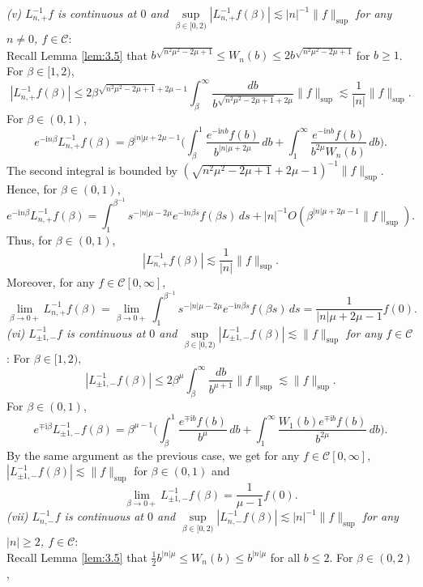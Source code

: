 \documentclass[11pt]{article}
\makeatletter
\renewenvironment{proof}[1][\proofname]{\par
  \vspace{-.7\topsep}%
  \pushQED{\qed}%
  \normalfont
  \topsep0pt \partopsep0pt %
  \trivlist
  \item[\hskip\labelsep
        \itshape
    #1\@addpunct{.}]\ignorespaces
}{%
  \popQED\endtrivlist\@endpefalse
  \addvspace{6pt plus 6pt} %
}
\theoremstyle{definition}
\theoremstyle{remark}
\numberwithin{equation}{section}
\newcommand{\mcal}{\mathcal}
\newcommand{\norm}[1]{\lVert #1 \rVert}
\makeatother
\begin{document}
\begin{proof}
\textit{(v) $L_{n,+}^{-1} f$ is continuous at $0$ and $\underset{\beta\in[0,2)}{\sup} |L_{n,+}^{-1} f(\beta)| \lesssim |n|^{-1} \norm{f}_{\sup}$ for any $n\neq 0$, $f\in \mcal{C}$}:\\
Recall Lemma \ref{lem:3.5} that $b^{\sqrt{n^2\mu^2 - 2\mu + 1}} \leq W_n(b) \leq 2 b^{\sqrt{n^2\mu^2 - 2\mu + 1}}$ for $b\geq 1$. For $\beta \in [1,2)$,
\[ |L_{n,+}^{-1} f(\beta)| \leq 2\beta^{\sqrt{n^2\mu^2 - 2\mu + 1} +2\mu -1} \int_\beta^\infty \frac{db}{b^{\sqrt{n^2 \mu^2 - 2\mu + 1}+2\mu }} \norm{f}_{\sup} \lesssim \frac{1}{|n|} \norm{f}_{\sup}.\]
For $\beta \in (0,1)$,
\[e^{-\textrm{i}n \beta} L_{n,+}^{-1} f(\beta) = \beta^{|n|\mu + 2\mu - 1} \bigg(\int_\beta^1 \frac{e^{-\textrm{i}n b} f(b)}{b^{|n|\mu + 2\mu}} \,db  + \int_1^\infty \frac{e^{-\textrm{i}n b} f(b)}{b^{2\mu} W_n(b)} \,db \bigg).\]
The second integral is bounded by $(\sqrt{n^2 \mu^2 - 2\mu + 1}+2\mu -1)^{-1} \norm{f}_{\sup}$. Hence, for $\beta\in (0,1)$,
\[e^{-\textrm{i}n \beta} L_{n,+}^{-1} f(\beta) = \int_1^{\beta^{-1}} s^{-|n|\mu - 2\mu} e^{-\textrm{i}n \beta s} f(\beta s) \,ds + |n|^{-1} O(\beta^{|n|\mu + 2\mu - 1} \norm{f}_{\sup}).\]
Thus, for $\beta\in (0,1)$,
\[|L_{n,+}^{-1} f(\beta)| \lesssim \frac{1}{|n|} \norm{f}_{\sup}.\]
Moreover, for any $f\in\mcal{C}[0,\infty]$,
\[\lim_{\beta \to 0+} L_{n,+}^{-1} f(\beta) = \lim_{\beta \to 0+} \int_1^{\beta^{-1}} s^{-|n|\mu - 2\mu} e^{-\textrm{i}n \beta s} f(\beta s) \,ds = \frac{1}{|n|\mu + 2\mu - 1} f(0).\]
\textit{(vi) $L_{\pm 1, -}^{-1} f$ is continuous at $0$ and $\underset{\beta\in[0,2)}{\sup} |L_{\pm 1,-}^{-1} f(\beta)| \lesssim \norm{f}_{\sup}$ for any $f\in\mcal{C}$}: For $\beta \in [1,2)$,
\[|L_{\pm 1, -}^{-1} f(\beta)| \leq 2\beta^\mu \int_\beta^\infty \frac{db}{b^{\mu + 1}} \norm{f}_{\sup} \lesssim \norm{f}_{\sup}.\]
For $\beta \in (0,1)$,
\[e^{\mp \textrm{i}\beta} L_{\pm 1, -}^{-1} f(\beta) = \beta^{\mu - 1} \bigg( \int_\beta^1 \frac{e^{\mp\textrm{i}b} f(b)}{b^\mu} \,db + \int_1^\infty \frac{W_1(b) e^{\mp\textrm{i}b} f(b)}{b^{2\mu}} \,db \bigg).\]
By the same argument as the previous case, we get for any $f\in \mcal{C}[0,\infty]$, $|L_{\pm 1, -}^{-1} f(\beta)| \lesssim \norm{f}_{\sup}$ for $\beta \in (0,1)$ and
\[\lim_{\beta \to 0+} L_{\pm 1, -}^{-1} f(\beta) = \frac{1}{\mu - 1} f(0).\]
\textit{(vii) $L_{n,-}^{-1} f$ is continuous at $0$ and $\underset{\beta\in[0,2)}{\sup} |L^{-1}_{n,-} f(\beta)| \lesssim |n|^{-1} \norm{f}_{\sup}$ for any $|n|\geq 2$, $f\in\mcal{C}$}:\\
Recall Lemma \ref{lem:3.5} that $\frac{1}{2} b^{|n|\mu} \leq W_n(b) \leq b^{|n|\mu}$ for all $b\leq 2$. For $\beta \in (0,2)$,

\end{proof}
\end{document}
